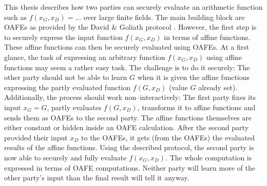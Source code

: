 \label{sec:introduction}

This thesis describes how two parties can securely evaluate an arithmetic
function such as $f(x_G,x_D) = ...$ over large finite fields. The main building
block are OAFEs as provided by the David \& Goliath protocol
\cite{davidgoliath}. However, the first step is to securely express the input
function $f(x_G, x_D)$ in terms of affine functions. These affine functions can
then be securely evaluated using OAFEs. At a first glance, the task of
expressing an arbitrary function $f(x_G, x_D)$ using affine functions may seem a
rather easy task. The challenge is to do it securely: The other party should not
be able to learn $G$ when it is given the affine functions expressing the partly
evaluated function $f(G, x_D)$ (value $G$ already set).  Additionally, the
process should work non--interactively: The first party fixes its input $x_G =
G$, partly evaluates $f(G, x_D)$, transforms it to affine functions and sends
them as OAFEs to the second party. The affine functions themselves are either
constant or hidden inside an OAFE calculation. After the second party provided
their input $x_D$ to the OAFEs, it gets (from the OAFEs) the evaluated results
of the affine functions. Using the described protocol, the second party is now
able to securely and fully evaluate $f(x_G, x_D)$. The whole computation is
expressed in terms of OAFE computations. Neither party will learn more of the
other party's input than the final result will tell it anyway.


\label{sec:related-work}

